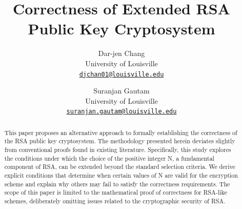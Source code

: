 \documentclass[oneside,12pt,]{article}
\title{Correctness of Extended RSA Public Key Cryptosystem}
\author{Dar-jen Chang\\
University of Louisville\\
\href{mailto:djchan01@louisville.edu}{\nolinkurl{djchan01@louisville.edu}}
\and
Suranjan Gautam\\
University of Louisville\\
\href{mailto:suranjan.gautam@louisville.edu}{\nolinkurl{suranjan.gautam@louisville.edu}}
}
\date{}
\numberwithin{equation}{section}
\begin{document}
\raggedbottom
\label{shorttitlelowercase}\hypertarget{shorttitlelowercase}{}
\maketitle
\thispagestyle{empty}
\renewcommand*{\abstractname}{Abstract}
\begin{abstract}
This paper proposes an alternative approach to formally establishing the correctness of the RSA public key cryptosystem. The methodology presented herein deviates slightly from conventional proofs found in existing literature. Specifically, this study explores the conditions under which the choice of the positive integer N, a fundamental component of RSA, can be extended beyond the standard selection criteria. We derive explicit conditions that determine when certain values of N are valid for the encryption scheme and explain why others may fail to satisfy the correctness requirements. The scope of this paper is limited to the mathematical proof of correctness for RSA-like schemes, deliberately omitting issues related to the cryptographic security of RSA.%
\end{abstract}
%
%
\typeout{************************************************}
\typeout{************************************************}
%
\end{document}
